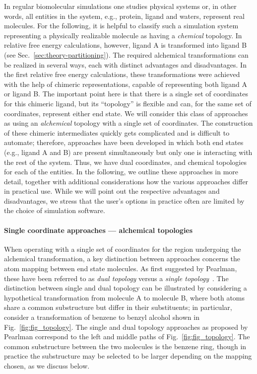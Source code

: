 \documentclass[9pt,bestpractices]{livecoms}
\begin{document}
In regular biomolecular simulations one studies physical systems or, in other words, all entities in the system, e.g., protein, ligand and waters, represent real molecules. For the following, it is helpful to classify such a simulation system representing a physically realizable molecule as having a {\em chemical} topology. In relative free energy calculations, however, ligand A is transformed into ligand B (see Sec.~\ref{sec:theory-partitioning}). The required alchemical transformations can be realized in several ways, each with distinct advantages and disadvantages. In the first relative free energy calculations, these transformations were achieved with the help of chimeric representations, capable of representing both ligand A or ligand B. The important point here is that there is a single set of coordinates for this chimeric ligand, but its ``topology'' is flexible and can, for the same set of coordinates, represent either end state. We will consider this class of approaches as using an {\em alchemical} topology with a single set of coordinates. The construction of these chimeric intermediates quickly gets complicated and is difficult to automate; therefore, approaches have been developed in which both end states (e.g., ligand A and B) are present simultaneously  but only one is interacting with the rest of the system. Thus, we have dual coordinates, and chemical topologies for each of the entities. In the following, we outline these approaches in more detail, together with additional considerations how the various approaches differ in practical use. While we will point out the respective advantages and disadvantages, we stress that the user's options in practice often are limited by the choice of simulation software.

\paragraph{Single coordinate approaches --- alchemical topologies}

When operating with a single set of coordinates for the region undergoing the alchemical transformation, a key distinction between approaches concerns the atom mapping between end state molecules. %
As first suggested by Pearlman, these have been referred to as \emph{dual topology} versus a \emph{single topology}~\cite{Pearlman_1994}. The distinction between single and dual topology can be illustrated by considering a hypothetical transformation from molecule A to molecule B, where both atoms share a common substructure but differ in their substituents; in particular, consider a transformation of benzene to benzyl alcohol shown in Fig.~\ref{fig:fig_topology}. The single and dual topology approaches as proposed by Pearlman correspond to the left and middle paths of Fig.~\ref{fig:fig_topology}.
The common substructure between the two molecules is the benzene ring, though in practice the substructure may be selected to be larger depending on the mapping chosen, as we discuss below.
\end{document}
